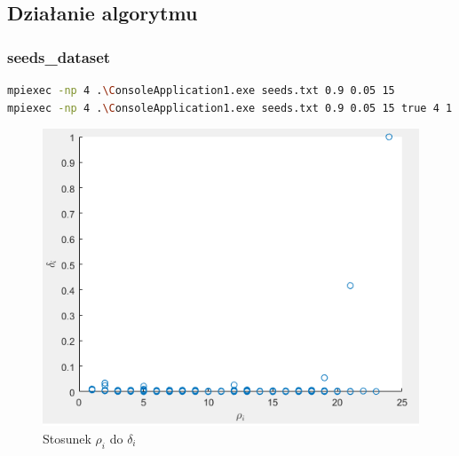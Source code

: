 \documentclass[a4paper,10pt,table]{article}
\begin{document}
\subsection{Działanie algorytmu}

\subsubsection{seeds\_dataset}

\begin{lstlisting}[language=BASH]
mpiexec -np 4 .\ConsoleApplication1.exe seeds.txt 0.9 0.05 15 
mpiexec -np 4 .\ConsoleApplication1.exe seeds.txt 0.9 0.05 15 true 4 1
\end{lstlisting}


\begin{figure}[h]
\begin{center}
\includegraphics[scale=0.5]{seedsdensdist.png}
\end{center}
\caption{Stosunek $\rho_i$ do $\delta_i$}
\end{figure} 
\end{document}
